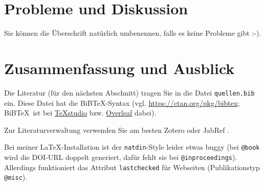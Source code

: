 \documentclass[12pt,oneside]{article}
\begin{document}
  \section{Probleme und Diskussion}
  
  Sie können die Überschrift natürlich umbenennen, falls es keine Probleme gibt :-).
  
  
  \section{Zusammenfassung und Ausblick}
  
  Die Literatur (für den nächsten Abschnitt) tragen Sie in die Datei \texttt{quellen.bib} ein. Diese Datei hat die BiB\TeX-Syntax (vgl. \url{https://ctan.org/pkg/bibtex}; BiB\TeX\ ist bei \href{https://www.heise.de/download/product/texstudio-62955}{\TeX studio} bzw. \href{https://www.overleaf.com}{Overleaf} dabei).
  
  Zur Literaturverwaltung verwenden Sie am besten Zotero \cite{zotero} oder JabRef \cite{jabref}. 
  
  Bei meiner \LaTeX-Installation ist der \texttt{natdin}-Style leider etwas buggy (bei \texttt{@book} wird die DOI-URL doppelt generiert, dafür fehlt sie bei \texttt{@inproceedings}). Allerdings funktioniert das
  Attribut \texttt{lastchecked} für Webseiten (Publikationstyp \texttt{@misc}).
  
  \clearpage %
  

  
  
  

\end{document}
